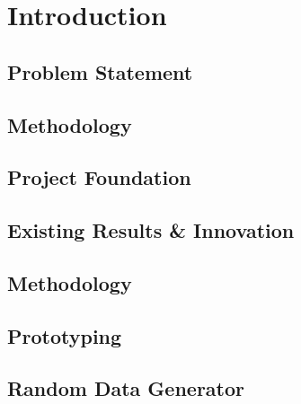 \chapter{Introduction}\label{ch:introduction}


\section{Problem Statement}



\section{Methodology}


\section{Project Foundation}

\section {Existing Results \& Innovation}\label{sec:existing_results_innovation}


\section{Methodology}\label{sec:methodology}

\section{Prototyping}\label{sec:prototyping}

\section{Random Data Generator}\label{sec:random_data_generator}
